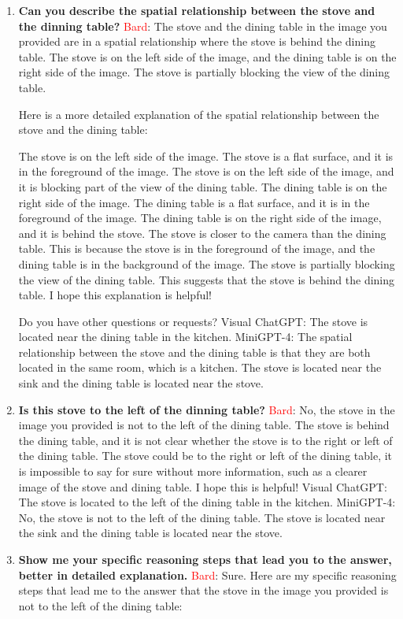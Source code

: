 \begin{enumerate}
    \item \textbf{Can you describe the spatial relationship between the stove and the dinning table?}
    \subitem \textcolor{Red}{Bard}: 
    The stove and the dining table in the image you provided are in a spatial relationship where the stove is behind the dining table. The stove is on the left side of the image, and the dining table is on the right side of the image. The stove is partially blocking the view of the dining table.
    
    Here is a more detailed explanation of the spatial relationship between the stove and the dining table:
    
    The stove is on the left side of the image. The stove is a flat surface, and it is in the foreground of the image. The stove is on the left side of the image, and it is blocking part of the view of the dining table.
    The dining table is on the right side of the image. The dining table is a flat surface, and it is in the foreground of the image. The dining table is on the right side of the image, and it is behind the stove.
    The stove is closer to the camera than the dining table. This is because the stove is in the foreground of the image, and the dining table is in the background of the image.
    The stove is partially blocking the view of the dining table. This suggests that the stove is behind the dining table.
    I hope this explanation is helpful!
    
    Do you have other questions or requests?
    \subitem Visual ChatGPT: The stove is located near the dining table in the kitchen.
    \subitem MiniGPT-4: The spatial relationship between the stove and the dining table is that they are both located in the same room, which is a kitchen. The stove is located near the sink and the dining table is located near the stove.
    \item \textbf{Is this stove to the left of the dinning table?}
    \subitem \textcolor{Red}{Bard}: 
    No, the stove in the image you provided is not to the left of the dining table. The stove is behind the dining table, and it is not clear whether the stove is to the right or left of the dining table.
    The stove could be to the right or left of the dining table, it is impossible to say for sure without more information, such as a clearer image of the stove and dining table.
    I hope this is helpful! 
    \subitem Visual ChatGPT: The stove is located to the left of the dining table in the kitchen.
    \subitem MiniGPT-4: No, the stove is not to the left of the dining table. The stove is located near the sink and the dining table is located near the stove.
    \item \textbf{Show me your specific reasoning steps that lead you to the answer, better in detailed explanation.}
    \subitem \textcolor{Red}{Bard}: 
    Sure. Here are my specific reasoning steps that lead me to the answer that the stove in the image you provided is not to the left of the dining table:
    

\end{enumerate}
